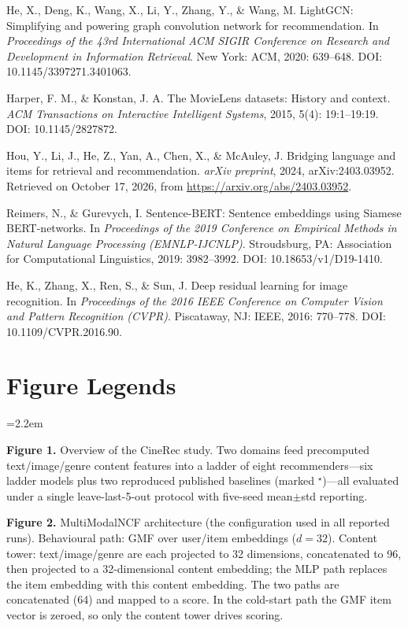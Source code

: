 \documentclass[11pt,a4paper]{article}
\newcommand{\figfont}{\fontsize{8}{10}\selectfont}
\begin{document}
\noindent [6] He, X., Deng, K., Wang, X., Li, Y., Zhang, Y., \& Wang, M.
LightGCN: Simplifying and powering graph convolution network for recommendation.
In \emph{Proceedings of the 43rd International ACM SIGIR Conference on Research
and Development in Information Retrieval}. New York: ACM, 2020: 639--648. DOI:
10.1145/3397271.3401063.

\noindent [7] Harper, F. M., \& Konstan, J. A. The MovieLens datasets: History
and context. \emph{ACM Transactions on Interactive Intelligent Systems}, 2015,
5(4): 19:1--19:19. DOI: 10.1145/2827872.

\noindent [8] Hou, Y., Li, J., He, Z., Yan, A., Chen, X., \& McAuley, J.
Bridging language and items for retrieval and recommendation. \emph{arXiv
preprint}, 2024, arXiv:2403.03952. Retrieved on October 17, 2026, from
\url{https://arxiv.org/abs/2403.03952}.

\noindent [9] Reimers, N., \& Gurevych, I. Sentence-BERT: Sentence embeddings
using Siamese BERT-networks. In \emph{Proceedings of the 2019 Conference on
Empirical Methods in Natural Language Processing (EMNLP-IJCNLP)}. Stroudsburg,
PA: Association for Computational Linguistics, 2019: 3982--3992. DOI:
10.18653/v1/D19-1410.

\noindent [10] He, K., Zhang, X., Ren, S., \& Sun, J. Deep residual learning for
image recognition. In \emph{Proceedings of the 2016 IEEE Conference on Computer
Vision and Pattern Recognition (CVPR)}. Piscataway, NJ: IEEE, 2016: 770--778.
DOI: 10.1109/CVPR.2016.90.

\endgroup

\clearpage
\section*{Figure Legends}
\begingroup
\figfont
\setlength{\parskip}{5pt}
\hangindent=2.2em 

\noindent \textbf{Figure 1.} Overview of the CineRec study. Two domains feed
precomputed text/image/genre content features into a ladder of eight
recommenders---six ladder models plus two reproduced published baselines (marked
$^\star$)---all evaluated under a single leave-last-5-out protocol with five-seed
mean$\pm$std reporting.

\noindent \textbf{Figure 2.} MultiModalNCF architecture (the configuration used
in all reported runs). Behavioural path: GMF over user/item embeddings
($d{=}32$). Content tower: text/image/genre are each projected to 32 dimensions,
concatenated to 96, then projected to a 32-dimensional content embedding; the MLP
path replaces the item embedding with this content embedding. The two paths are
concatenated (64) and mapped to a score. In the cold-start path the GMF item
vector is zeroed, so only the content tower drives scoring.
\end{document}
